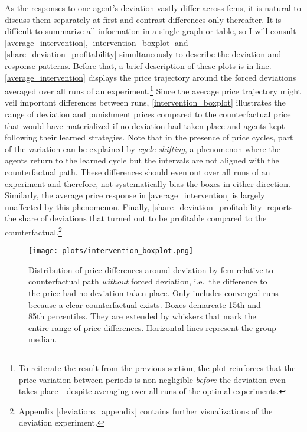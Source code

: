 As the responses to one agent's deviation vastly differ across \gls{fem}s, it is natural to discuss them separately at first and contrast differences only thereafter. It is difficult to summarize all information in a single graph or table, so I will consult \autoref{average_intervention}, \autoref{intervention_boxplot} and \autoref{share_deviation_profitability} simultaneously to describe the deviation and response patterns. Before that, a brief description of these plots is in line. \autoref{average_intervention} displays the price trajectory around the forced deviations averaged over all runs of an experiment.\footnote{To reiterate the result from the previous section, the plot reinforces that the price variation between periods is non-negligible \emph{before} the deviation even takes place - despite averaging over all runs of the optimal experiments.}  Since the average price trajectory might veil important differences between runs, \autoref{intervention_boxplot} illustrates the range of deviation and punishment prices compared to the counterfactual price that would have materialized if no deviation had taken place and agents kept following their learned strategies. Note that in the presence of price cycles, part of the variation can be explained by \emph{cycle shifting}, a phenomenon where the agents return to the learned cycle but the intervals are not aligned with the counterfactual path. These differences should even out over all runs of an experiment and therefore, not systematically bias the boxes in either direction. Similarly, the average price response in \autoref{average_intervention} is largely unaffected by this phenomenon. Finally, \autoref{share_deviation_profitability} reports the share of deviations that turned out to be profitable compared to the counterfactual.\footnote{Appendix \ref{deviations_appendix} contains further visualizations of the deviation experiment.}

\begin{figure}
	\texttt{[image: plots/intervention\_boxplot.png]}
	\caption[Distribution of price differences around deviation by \gls{fem}]{Distribution of price differences around deviation by \gls{fem} relative to counterfactual path \emph{without} forced deviation, i.e.\ the difference to the price had no deviation taken place. Only includes converged runs because a clear counterfactual exists. Boxes demarcate 15th and 85th percentiles. They are extended by whiskers that mark the entire range of price differences. Horizontal lines represent the group median.}
	\label{intervention_boxplot}
\end{figure}

